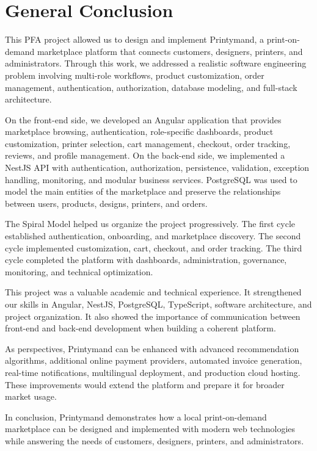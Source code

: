 \chapter*{General Conclusion}

This PFA project allowed us to design and implement Printymand, a print-on-demand marketplace platform that connects customers, designers, printers, and administrators.
Through this work, we addressed a realistic software engineering problem involving multi-role workflows, product customization, order management, authentication, authorization, database modeling, and full-stack architecture.

On the front-end side, we developed an Angular application that provides marketplace browsing, authentication, role-specific dashboards, product customization, printer selection, cart management, checkout, order tracking, reviews, and profile management.
On the back-end side, we implemented a NestJS API with authentication, authorization, persistence, validation, exception handling, monitoring, and modular business services.
PostgreSQL was used to model the main entities of the marketplace and preserve the relationships between users, products, designs, printers, and orders.

The Spiral Model helped us organize the project progressively.
The first cycle established authentication, onboarding, and marketplace discovery.
The second cycle implemented customization, cart, checkout, and order tracking.
The third cycle completed the platform with dashboards, administration, governance, monitoring, and technical optimization.

This project was a valuable academic and technical experience.
It strengthened our skills in Angular, NestJS, PostgreSQL, TypeScript, software architecture, and project organization.
It also showed the importance of communication between front-end and back-end development when building a coherent platform.

As perspectives, Printymand can be enhanced with advanced recommendation algorithms, additional online payment providers, automated invoice generation, real-time notifications, multilingual deployment, and production cloud hosting.
These improvements would extend the platform and prepare it for broader market usage.

In conclusion, Printymand demonstrates how a local print-on-demand marketplace can be designed and implemented with modern web technologies while answering the needs of customers, designers, printers, and administrators.